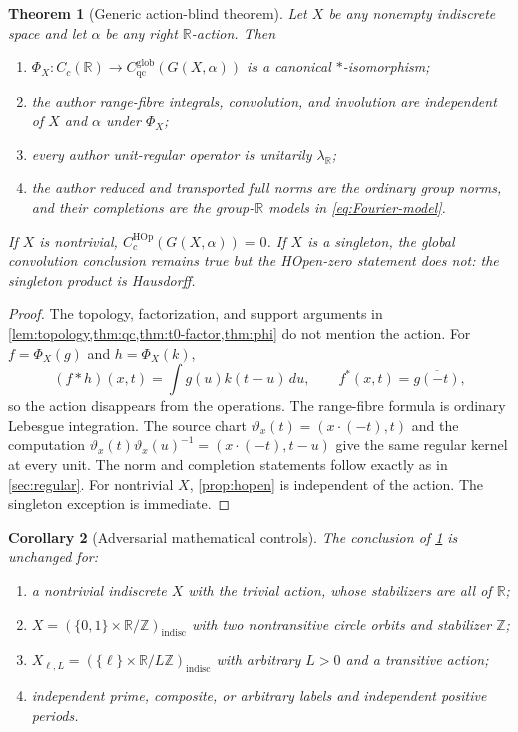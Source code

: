 \documentclass[11pt]{article}
\newtheorem{theorem}{Theorem}[section]
\newtheorem{corollary}[theorem]{Corollary}
\theoremstyle{definition}
\newcommand{\R}{\mathbb R}
\newcommand{\Z}{\mathbb Z}
\newcommand{\Cglob}{C_{\mathrm{qc}}^{\mathrm{glob}}}
\newcommand{\CHOp}{C_c^{\mathrm{HOp}}}
\begin{document}
\begin{theorem}[Generic action-blind theorem]
\label{thm:action-blind}
Let $X$ be any nonempty indiscrete space and let $\alpha$ be any right
$\R$-action.  Then
\begin{enumerate}
\item $\Phi_X:C_c(\R)\to\Cglob(G(X,\alpha))$ is a canonical
  $*$-isomorphism;
\item the author range-fibre integrals, convolution, and involution are
  independent of $X$ and $\alpha$ under $\Phi_X$;
\item every author unit-regular operator is unitarily $\lambda_{\R}$;
\item the author reduced and transported full norms are the ordinary group
  norms, and their completions are the group-$\R$ models in
  \cref{eq:Fourier-model}.
\end{enumerate}
If $X$ is nontrivial, $\CHOp(G(X,\alpha))=0$.  If $X$ is a singleton, the
global convolution conclusion remains true but the HOpen-zero statement
does not: the singleton product is Hausdorff.
\end{theorem}

\begin{proof}
The topology, factorization, and support arguments in
\cref{lem:topology,thm:qc,thm:t0-factor,thm:phi} do not mention the action.
For $f=\Phi_X(g)$ and $h=\Phi_X(k)$,
\[
 (f*h)(x,t)=\int g(u)k(t-u)\,du,
 \qquad f^*(x,t)=\overline{g(-t)},
\]
so the action disappears from the operations.  The range-fibre formula is
ordinary Lebesgue integration.  The source chart
$\vartheta_x(t)=(x\cdot(-t),t)$ and the computation
$\vartheta_x(t)\vartheta_x(u)^{-1}=(x\cdot(-t),t-u)$ give the same regular
kernel at every unit.  The norm and completion statements follow exactly as
in \cref{sec:regular}.  For nontrivial $X$, \cref{prop:hopen} is independent
of the action.  The singleton exception is immediate.
\end{proof}

\begin{corollary}[Adversarial mathematical controls]
\label{cor:math-controls}
The conclusion of \cref{thm:action-blind} is unchanged for:
\begin{enumerate}
\item a nontrivial indiscrete $X$ with the trivial action, whose stabilizers
  are all of $\R$;
\item $X=(\{0,1\}\times\R/\Z)_{\mathrm{indisc}}$ with two nontransitive
  circle orbits and stabilizer $\Z$;
\item $X_{\ell,L}=(\{\ell\}\times\R/L\Z)_{\mathrm{indisc}}$ with arbitrary
  $L>0$ and a transitive action;
\item independent prime, composite, or arbitrary labels and independent
  positive periods.
\end{enumerate}
\end{corollary}
\end{document}
